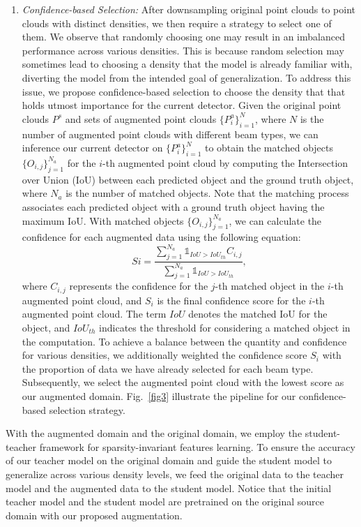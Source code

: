 \begin{enumerate}[label=\emph{\arabic*)}, wide]
    \item \emph{Confidence-based Selection:} After downsampling original point clouds to point clouds with distinct densities, we then require a strategy to select one of them. We observe that randomly choosing one may result in an imbalanced performance across various densities. This is because random selection may sometimes lead to choosing a density that the model is already familiar with, diverting the model from the intended goal of generalization. To address this issue, we propose confidence-based selection to choose the density that that holds utmost importance for the current detector. Given the original point clouds $P^{s}$ and sets of augmented point clouds $\{P^{a}_{i}\}_{i=1}^{N}$, where $N$ is the number of augmented point clouds with different beam types, we can inference our current detector on  $\{P^{a}_{i}\}_{i=1}^{N}$ to obtain the matched objects $\{O_{i, j}\}_{j=1}^{N_{a}}$ for the $i$-th augmented point cloud by computing the Intersection over Union (IoU) between each predicted object and the ground truth object, where $N_{a}$ is the number of matched objects. Note that the matching process associates each predicted object with a ground truth object having the maximum IoU. With matched objects $\{O_{i, j}\}_{j=1}^{N_{a}}$, we can calculate the confidence for each augmented data using the following equation:
    \begin{equation}
        S{i} = \frac{\sum_{j=1}^{N_{a}}{\mathds{1}_{IoU>IoU_{th}} C_{i,j}}}{\sum_{j=1}^{N_{a}}{\mathds{1}_{IoU>IoU_{th}}}},
    \end{equation}
    where $C_{i,j}$ represents the confidence for the $j$-th matched object in the $i$-th augmented point cloud, and $S_{i}$ is the final confidence score for the $i$-th augmented point cloud. The term $IoU$ denotes the matched IoU for the object, and $IoU_{th}$ indicates the threshold for considering a matched object in the computation. To achieve a balance between the quantity and confidence for various densities, we additionally weighted the confidence score $S_{i}$ with the proportion of data we have already selected for each beam type. Subsequently, we select the augmented point cloud with the lowest score as our augmented domain. Fig.~\ref{fig3} illustrate the pipeline for our confidence-based selection strategy.
\end{enumerate}

With the augmented domain and the original domain, we employ the student-teacher framework for sparsity-invariant features learning. To ensure the accuracy of our teacher model on the original domain and guide the student model to generalize across various density levels, we feed the original data to the teacher model and the augmented data to the student model. Notice that the initial teacher model and the student model are pretrained on the original source domain with our proposed augmentation.

